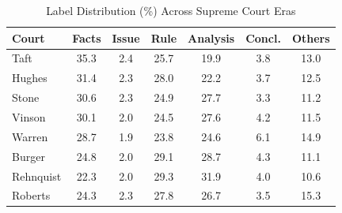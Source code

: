 \begin{table}[h]
\centering
\caption{Label Distribution (\%) Across Supreme Court Eras}
\label{tab:label_by_court}
\begin{tabular}{l|cccccc}
\toprule
\textbf{Court} & \textbf{Facts} & \textbf{Issue} & \textbf{Rule} & \textbf{Analysis} & \textbf{Concl.} & \textbf{Others} \\
\midrule
Taft & 35.3 & 2.4 & 25.7 & 19.9 & 3.8 & 13.0 \\
Hughes & 31.4 & 2.3 & 28.0 & 22.2 & 3.7 & 12.5 \\
Stone & 30.6 & 2.3 & 24.9 & 27.7 & 3.3 & 11.2 \\
Vinson & 30.1 & 2.0 & 24.5 & 27.6 & 4.2 & 11.5 \\
Warren & 28.7 & 1.9 & 23.8 & 24.6 & 6.1 & 14.9 \\
Burger & 24.8 & 2.0 & 29.1 & 28.7 & 4.3 & 11.1 \\
Rehnquist & 22.3 & 2.0 & 29.3 & 31.9 & 4.0 & 10.6 \\
Roberts & 24.3 & 2.3 & 27.8 & 26.7 & 3.5 & 15.3 \\
\bottomrule
\end{tabular}
\end{table}
